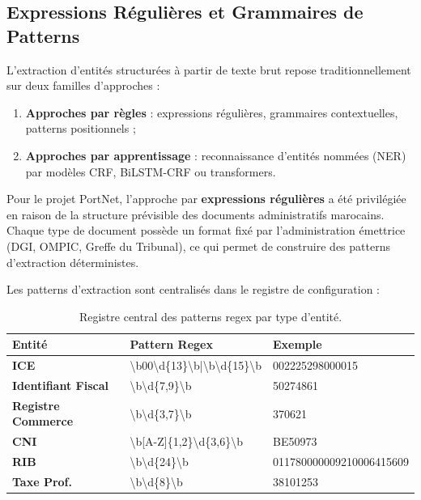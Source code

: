 \subsection{Expressions R\'{e}guli\`{e}res et Grammaires de Patterns}

L'extraction d'entit\'{e}s structur\'{e}es \`{a} partir de texte brut repose traditionnellement sur deux familles d'approches :

\begin{enumerate}[leftmargin=*, itemsep=4pt]
    \item \textbf{Approches par r\`{e}gles} : expressions r\'{e}guli\`{e}res, grammaires contextuelles, patterns positionnels ;
    \item \textbf{Approches par apprentissage} : reconnaissance d'entit\'{e}s nomm\'{e}es (NER) par mod\`{e}les CRF, BiLSTM-CRF ou transformers.
\end{enumerate}

Pour le projet PortNet, l'approche par \textbf{expressions r\'{e}guli\`{e}res} a \'{e}t\'{e} privil\'{e}gi\'{e}e en raison de la structure pr\'{e}visible des documents administratifs marocains. Chaque type de document poss\`{e}de un format fix\'{e} par l'administration \'{e}mettrice (DGI, OMPIC, Greffe du Tribunal), ce qui permet de construire des patterns d'extraction d\'{e}terministes.

Les patterns d'extraction sont centralis\'{e}s dans le registre de configuration :

\begin{table}[H]
\centering
\small
\begin{tabularx}{\textwidth}{@{}>{\bfseries}p{3.5cm} >{\ttfamily}p{5cm} Y@{}}
\toprule
{}
Entit\'{e} & Pattern Regex & Exemple \\
\midrule
ICE & \textbackslash b00\textbackslash d\{13\}\textbackslash b|\textbackslash b\textbackslash d\{15\}\textbackslash b & 002225298000015 \\
Identifiant Fiscal & \textbackslash b\textbackslash d\{7,9\}\textbackslash b & 50274861 \\
Registre Commerce & \textbackslash b\textbackslash d\{3,7\}\textbackslash b & 370621 \\
CNI & \textbackslash b[A-Z]\{1,2\}\textbackslash d\{3,6\}\textbackslash b & BE50973 \\
RIB & \textbackslash b\textbackslash d\{24\}\textbackslash b & 011780000009210006415609 \\
Taxe Prof. & \textbackslash b\textbackslash d\{8\}\textbackslash b & 38101253 \\
\bottomrule
\end{tabularx}
\caption{Registre central des patterns regex par type d'entit\'{e}.}
\label{tab:regex-patterns}
\end{table}


